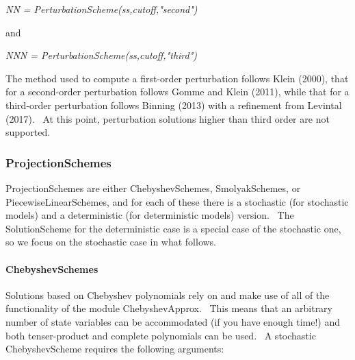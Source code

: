 \documentclass[notitlepage,11pt]{article}
\begin{document}
\textit{NN = PerturbationScheme(ss,cutoff,"second")}

\bigskip

and

\bigskip

\textit{NNN = PerturbationScheme(ss,cutoff,"third")}

\bigskip

The method used to compute a first-order perturbation follows Klein (2000),
that for a second-order perturbation follows Gomme and Klein (2011), while
that for a third-order perturbation follows Binning (2013) with a refinement
from Levintal (2017). \ At this point, perturbation solutions higher than
third order are not supported.

\subsubsection{ProjectionSchemes}

ProjectionSchemes are either ChebyshevSchemes, SmolyakSchemes, or
PiecewiseLinearSchemes, and for each of these there is a stochastic (for
stochastic models) and a deterministic (for deterministic models) version. \
The SolutionScheme for the deterministic case is a special case of the
stochastic one, so we focus on the stochastic case in what follows.

\paragraph{ChebyshevSchemes}

Solutions based on Chebyshev polynomials rely on and make use of all of the
functionality of the module ChebyshevApprox. \ This means that an arbitrary
number of state variables can be accommodated (if you have enough time!) and
both tenser-product and complete polynomials can be used. \ A stochastic
ChebyshevScheme requires the following arguments:
\end{document}
